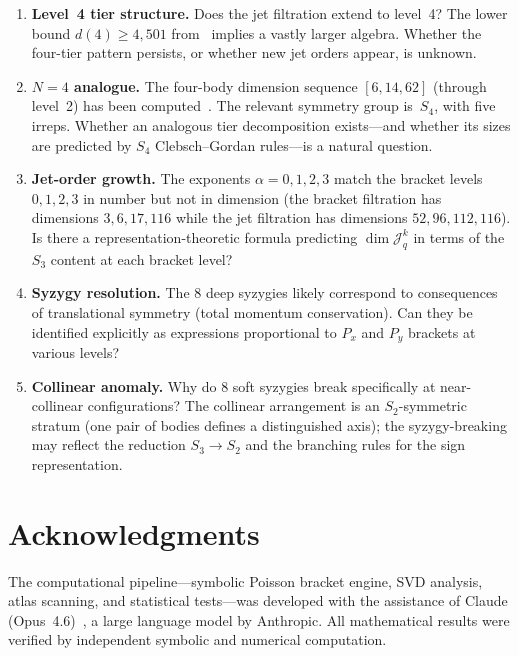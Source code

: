 \documentclass[11pt,a4paper]{article}
\theoremstyle{remark}
\newcommand{\cJ}{\mathcal{J}}
\newcommand{\SG}{S_3}
\begin{document}
\begin{enumerate}
  \item \textbf{Level~4 tier structure.}  Does the jet
    filtration extend to level~4?  The lower bound
    $d(4) \ge 4{,}501$ from~\cite{paper1} implies a
    vastly larger algebra.  Whether the four-tier
    pattern persists, or whether new jet orders appear,
    is unknown.

  \item \textbf{$N = 4$ analogue.}  The four-body
    dimension sequence $[6, 14, 62]$ (through level~2)
    has been computed~\cite{paper1}.  The relevant
    symmetry group is~$S_4$, with five irreps.  Whether
    an analogous tier decomposition exists---and whether
    its sizes are predicted by $S_4$
    Clebsch--Gordan rules---is a natural question.

  \item \textbf{Jet-order growth.}  The exponents
    $\alpha = 0, 1, 2, 3$ match the bracket levels
    $0, 1, 2, 3$ in number but not in dimension
    (the bracket filtration has dimensions $3, 6, 17, 116$
    while the jet filtration has dimensions $52, 96, 112,
    116$).  Is there a representation-theoretic formula
    predicting $\dim \cJ^k_q$ in terms of the $\SG$
    content at each bracket level?

  \item \textbf{Syzygy resolution.}  The 8 deep syzygies
    likely correspond to consequences of translational
    symmetry (total momentum conservation).  Can they be
    identified explicitly as expressions proportional
    to $P_x$ and $P_y$ brackets at various levels?

  \item \textbf{Collinear anomaly.}  Why do 8 soft
    syzygies break specifically at near-collinear
    configurations?  The collinear arrangement is an
    $S_2$-symmetric stratum (one pair of bodies defines
    a distinguished axis); the syzygy-breaking may
    reflect the reduction $\SG \to S_2$ and the
    branching rules for the sign representation.
\end{enumerate}


\section*{Acknowledgments}

The computational pipeline---symbolic Poisson bracket
engine, SVD analysis, atlas scanning, and statistical
tests---was developed with the assistance of Claude
(Opus~4.6)~\cite{claude-2026}, a large language model by
Anthropic.  All mathematical results were verified by
independent symbolic and numerical computation.
\end{document}
